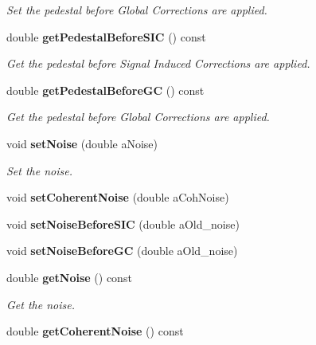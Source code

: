 \begin{DoxyCompactItemize}
\begin{DoxyCompactList}\small\item\em Set the pedestal before Global Corrections are applied. \item\end{DoxyCompactList}\item 
double {\bf getPedestalBeforeSIC} () const \label{classCALICE_1_1NoiseParameter_a8aa648b980a102191797e806bec1fe1b}

\begin{DoxyCompactList}\small\item\em Get the pedestal before Signal Induced Corrections are applied. \item\end{DoxyCompactList}\item 
double {\bf getPedestalBeforeGC} () const \label{classCALICE_1_1NoiseParameter_a2075113211efc4ce905ad6698775b9ed}

\begin{DoxyCompactList}\small\item\em Get the pedestal before Global Corrections are applied. \item\end{DoxyCompactList}\item 
void {\bf setNoise} (double aNoise)\label{classCALICE_1_1NoiseParameter_aa887925f83397f287cad1cf77f5beb5f}

\begin{DoxyCompactList}\small\item\em Set the noise. \item\end{DoxyCompactList}\item 
void {\bfseries setCoherentNoise} (double aCohNoise)\label{classCALICE_1_1NoiseParameter_a8cab49decf1acc0c958d8b2c4f4135ce}

\item 
void {\bfseries setNoiseBeforeSIC} (double aOld\_\-noise)\label{classCALICE_1_1NoiseParameter_ac4acc09827523e318148775dc1334fdb}

\item 
void {\bfseries setNoiseBeforeGC} (double aOld\_\-noise)\label{classCALICE_1_1NoiseParameter_a2db1c2d78cea0327da44aea672a846a4}

\item 
double {\bf getNoise} () const 
\begin{DoxyCompactList}\small\item\em Get the noise. \item\end{DoxyCompactList}\item 
double {\bfseries getCoherentNoise} () const \label{classCALICE_1_1NoiseParameter_a5a63ace1e424cac33ceccc67d15625b9}


\end{DoxyCompactItemize}
